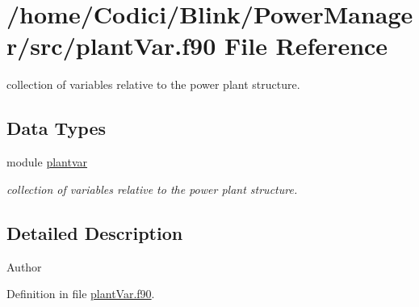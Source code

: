 \hypertarget{plant_var_8f90}{\section{/home/\-Codici/\-Blink/\-Power\-Manager/src/plant\-Var.f90 File Reference}
\label{plant_var_8f90}
}


collection of variables relative to the power plant structure.  


\subsection*{Data Types}
\begin{DoxyCompactItemize}
\item 
module \hyperlink{classplantvar}{plantvar}
\begin{DoxyCompactList}\small\item\em collection of variables relative to the power plant structure. \end{DoxyCompactList}\end{DoxyCompactItemize}


\subsection{Detailed Description}
\begin{DoxyAuthor}{Author}

\end{DoxyAuthor}


Definition in file \hyperlink{plant_var_8f90_source}{plant\-Var.\-f90}.

